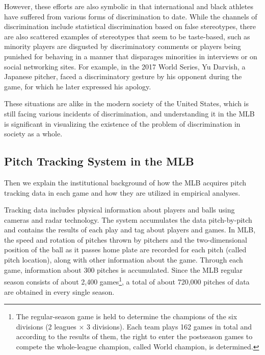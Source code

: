 \documentclass[dvipdfmx, 12pt]{jsarticle}
\begin{document}
However, these efforts are also symbolic in that international and black athletes have suffered from various forms of discrimination to date. While the channels of discrimination include statistical discrimination based on false stereotypes, there are also scattered examples of stereotypes that seem to be taste-based, such as minority players are disgusted by discriminatory comments or players being punished for behaving in a manner that disparages minorities in interviews or on social networking sites. For example, in the 2017 World Series, Yu Darvish, a Japanese pitcher, faced a discriminatory gesture by his opponent during the game, for which he later expressed his apology.

These situations are alike in the modern society of the United States, which is still facing various incidents of discrimination, and understanding it in the MLB is significant in visualizing the existence of the problem of discrimination in society as a whole.

\subsection{Pitch Tracking System in the MLB}

Then we explain the institutional background of how the MLB acquires pitch tracking data in each game and how they are utilized in empirical analyses.

Tracking data includes physical information about players and balls using cameras and radar technology. The system accumulates the data pitch-by-pitch and contains the results of each play and tag about players and games. In MLB, the speed and rotation of pitches thrown by pitchers and the two-dimensional position of the ball as it passes home plate are recorded for each pitch (called pitch location), along with other information about the game. Through each game, information about 300 pitches is accumulated. Since the MLB regular season consists of about 2,400 games\footnote{The regular-season game is held to determine the champions of the six divisions (2 leagues $\times$ 3 divisions). Each team plays 162 games in total and according to the results of them, the right to enter the postseason games to compete the whole-league champion, called World champion, is determined.}, a total of about 720,000 pitches of data are obtained in every single season.
\end{document}
